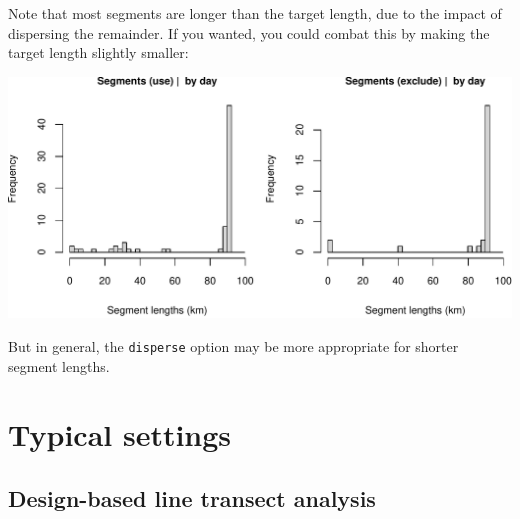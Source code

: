 \documentclass[
]{book}
\newenvironment{Shaded}{\begin{snugshade}}{\end{snugshade}}
\newcommand{\CommentTok}[1]{\textcolor[rgb]{0.56,0.35,0.01}{\textit{#1}}}
\newcommand{\DataTypeTok}[1]{\textcolor[rgb]{0.13,0.29,0.53}{#1}}
\newcommand{\DecValTok}[1]{\textcolor[rgb]{0.00,0.00,0.81}{#1}}
\newcommand{\KeywordTok}[1]{\textcolor[rgb]{0.13,0.29,0.53}{\textbf{#1}}}
\newcommand{\NormalTok}[1]{#1}
\newcommand{\OperatorTok}[1]{\textcolor[rgb]{0.81,0.36,0.00}{\textbf{#1}}}
\newcommand{\OtherTok}[1]{\textcolor[rgb]{0.56,0.35,0.01}{#1}}
\newcommand{\StringTok}[1]{\textcolor[rgb]{0.31,0.60,0.02}{#1}}
\begin{document}
Note that most segments are longer than the target length, due to the impact of dispersing the remainder. If you wanted, you could combat this by making the target length slightly smaller:

\begin{Shaded}
\end{Shaded}

\includegraphics{figures/unnamed-chunk-382-1.pdf}

But in general, the \texttt{disperse} option may be more appropriate for shorter segment lengths.

\hypertarget{typical-settings}{%
\section*{Typical settings}\label{typical-settings}}

\hypertarget{design-based-line-transect-analysis}{%
\subsection*{Design-based line transect analysis}\label{design-based-line-transect-analysis}}
\end{document}
